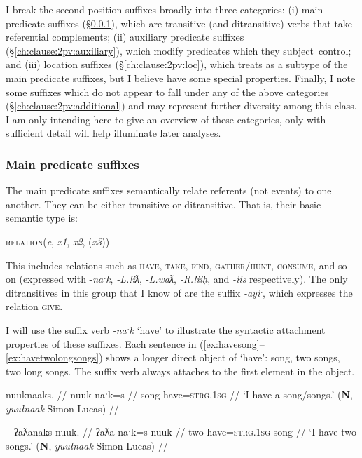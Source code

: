 I break the second position suffixes broadly into three categories: (i) main predicate suffixes (\S\ref{ch:clause:2pv:mainpredicate}), which are transitive (and ditransitive) verbs that take referential complements; (ii) auxiliary predicate suffixes (\S\ref{ch:clause:2pv:auxiliary}), which modify predicates which they subject control; and (iii) location suffixes (\S\ref{ch:clause:2pv:loc}), which \cite{wojdak2005} treats as a subtype of the main predicate suffixes, but I believe have some special properties. Finally, I note some suffixes which do not appear to fall under any of the above categories (\S\ref{ch:clause:2pv:additional}) and may represent further diversity among this class. I am only intending here to give an overview of these categories, only with sufficient detail will help illuminate later analyses.

\subsubsection{Main predicate suffixes} \label{ch:clause:2pv:mainpredicate}

The main predicate suffixes semantically relate referents (not events) to one another. They can be either transitive or ditransitive. That is, their basic semantic type is:

\ex
\textsc{relation}(\textit{e}, \textit{x1}, \textit{x2}, (\textit{x3}))
\xe

This includes relations such as \textsc{have}, \textsc{take}, \textsc{find}, \textsc{gather/hunt}, \textsc{consume}, and so on (expressed with -\textit{naˑk}, \textit{-L.!iƛ}, \textit{-L.waƛ}, \textit{-R.!iiḥ}, and \textit{-iis} respectively). The only ditransitives in this group that I know of are the suffix \textit{-ayiˑ}, which expresses the relation \textsc{give}.

I will use the suffix verb \textit{-naˑk} `have' to illustrate the syntactic attachment properties of these suffixes. Each sentence in (\ref{ex:havesong}--\ref{ex:havetwolongsongs}) shows a longer direct object of `have': song, two songs, two long songs. The suffix verb always attaches to the first element in the object.

\ex \label{ex:havesong}
\begingl
\glpreamble nuuknaaks. //
\gla nuuk-naˑk=s //
\glb song-have=\textsc{strg.1sg} //
\glft `I have a song/songs.' (\textbf{N}, \textit{yuułnaak} Simon Lucas) //
\endgl
\xe

\ex~ \label{ex:havetwosongs}
\begingl
\glpreamble ʔaƛanaks nuuk. //
\gla ʔaƛa-naˑk=s nuuk //
\glb two-have=\textsc{strg.1sg} song //
\glft `I have two songs.' (\textbf{N}, \textit{yuułnaak} Simon Lucas) //
\endgl
\xe

